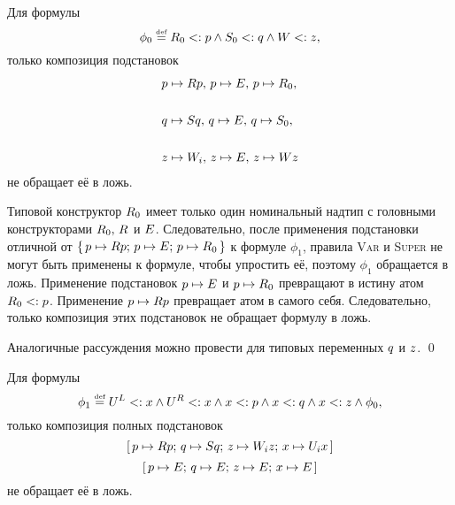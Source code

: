 \begin{lem}{\label{lem:pcpconstr}}
Для формулы
\[
    \phi_{0} \mathrel{\stackrel{\mbox{\normalfont\tiny def}}{=}} {R}_{0} <: p \land {S}_{0} <: q \land {W} <: z,
\]
только композиция подстановок
\[
    \begin{array}{l}
        p \mapsto {R}p, \, p \mapsto {E}, \, p \mapsto {R}_{0}, \, \\
        [0.6em] \\
        q \mapsto {S}q, \, q \mapsto {E}, \, q \mapsto {S}_{0}, \, \\
        [0.6em] \\
        z \mapsto {W}_{i}, \, z \mapsto {E}, \, z \mapsto {W}z
    \end{array}
\] не обращает её в ложь.
\end{lem}
\begin{proof*}
    Типовой конструктор ${R}_{0}$ имеет только один номинальный надтип с головными конструкторами ${R}_{0}, \, {R}$ и ${E}$. Следовательно, после применения подстановки отличной от $\lbrace \, p \mapsto {R}p; \, p \mapsto {E}; \, p \mapsto {R}_{0} \, \rbrace$ к формуле $\phi_1$, правила \textsc{Var} и \textsc{Super} не могут быть применены к формуле, чтобы упростить её, поэтому $\phi_1$ обращается в ложь. Применение подстановок $p \mapsto {E}$ и $p \mapsto {R}_{0}$ превращают в истину атом ${R}_{0} <: p$. Применение $p \mapsto {R}p$ превращает атом в самого себя. Следовательно, только композиция этих подстановок не обращает формулу в ложь.
    
    Аналогичные рассуждения можно провести для типовых переменных $q$ и $z$.
\qed\end{proof*}
%
\begin{lem}{\label{lem:pcpphi1}}
Для формулы
\[
    \phi_{1} \mathrel{\stackrel{\mbox{\normalfont\tiny def}}{=}} {U}^{L} <: x \land {U}^{R} <: x \land x <: p \land x <: q \land x <: z \land \phi_{0},
\]
только композиция полных подстановок
\[
    \textrm{[} \, p \mapsto {R}p; \, q \mapsto {S}q; \,
    z \mapsto {W}_{i}z; \,
    x \mapsto {U}_{i}x \, \textrm{]}
\]
\[
    \textrm{[} \, p \mapsto {E}; \, q \mapsto {E}; \,
    z \mapsto {E}; \, x \mapsto {E} \, \textrm{]}
\] не обращает её в ложь.
\end{lem}
